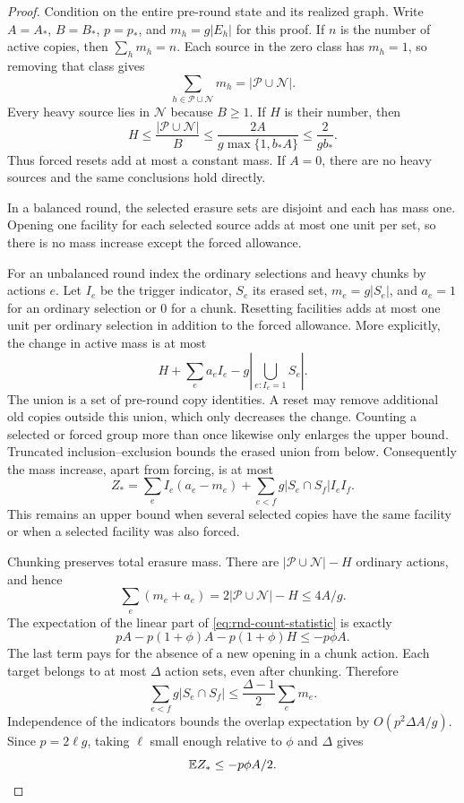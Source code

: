 \begin{proof}
Condition on the entire pre-round state and its realized graph.
Write $A=A_*$, $B=B_*$, $p=p_*$, and $m_h=g|E_h|$ for this proof.
If $n$ is the number of active copies, then $\sum_hm_h=n$.
Each source in the zero class has $m_h=1$, so removing that class gives
\[
 \sum_{h\in\mathcal P\cup\mathcal N}m_h
 =|\mathcal P\cup\mathcal N|.
\]
Every heavy source lies in $\mathcal N$ because $B\ge1$.  If $H$ is
their number, then
\begin{equation}\label{eq:rnd-heavy-count}
 H\le\frac{|\mathcal P\cup\mathcal N|}{B}
 \le\frac{2A}{g\max\{1,b_*A\}}
 \le\frac{2}{gb_*}.
\end{equation}
Thus forced resets add at most a constant mass.  If $A=0$, there are
no heavy sources and the same conclusions hold directly.

In a balanced round, the selected erasure sets are disjoint and each
has mass one.  Opening one facility for each selected source adds at
most one unit per set, so there is no mass increase except the forced
allowance.

For an unbalanced round index the ordinary selections and heavy
chunks by actions $e$.  Let $I_e$ be the trigger indicator, $S_e$ its
erased set, $m_e=g|S_e|$, and $a_e=1$ for an ordinary selection or $0$
for a chunk.  Resetting facilities adds at most one unit per ordinary
selection in addition to the forced allowance. More explicitly, the
change in active mass is at most
\[
 H+\sum_e a_e I_e
   -g\left|\bigcup_{e:I_e=1}S_e\right|.
\]
The union is a set of pre-round copy identities. A reset may remove
additional old copies outside this union, which only decreases the
change. Counting a selected or forced group more than once likewise
only enlarges the upper bound. Truncated inclusion--exclusion bounds
the erased union from below. Consequently the mass increase, apart
from forcing, is at most
\begin{equation}\label{eq:rnd-count-statistic}
 Z_* =\sum_e I_e(a_e-m_e)
       +\sum_{e<f}g|S_e\cap S_f|I_eI_f.
\end{equation}
This remains an upper bound when several selected copies have the
same facility or when a selected facility was also forced.

Chunking preserves total erasure mass.  There are
$|\mathcal P\cup\mathcal N|-H$ ordinary actions, and hence
\begin{equation}\label{eq:rnd-action-total}
 \sum_e(m_e+a_e)
 =2|\mathcal P\cup\mathcal N|-H\le4A/g.
\end{equation}
The expectation of the linear part of \eqref{eq:rnd-count-statistic}
is exactly
\[
 pA-p(1+\phi)A-p(1+\phi)H\le-p\phi A.
\]
The last term pays for the absence of a new opening in a chunk action.
Each target belongs to at most $\Delta$ action sets, even after
chunking.  Therefore
\[
 \sum_{e<f}g|S_e\cap S_f|
 \le\frac{\Delta-1}{2}\sum_em_e.
\]
Independence of the indicators bounds the overlap expectation by
$O(p^2\Delta A/g)$.  Since $p=2\ell g$, taking $\ell$ small enough
relative to $\phi$ and $\Delta$ gives
\begin{equation}\label{eq:rnd-count-mean}
 \mathbb E Z_*\le-p\phi A/2.
\end{equation}


\end{proof}
